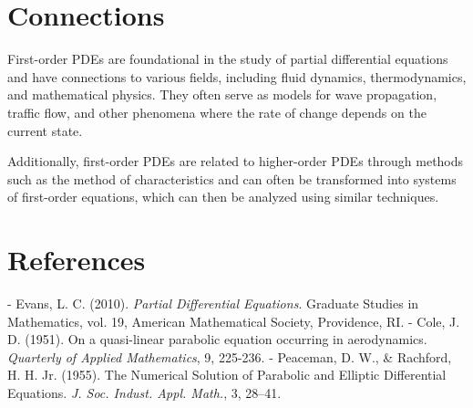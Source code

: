 \documentclass[11pt,a4paper]{article}
\begin{document}
\section{Connections}
First-order PDEs are foundational in the study of partial differential equations and have connections to various fields, including fluid dynamics, thermodynamics, and mathematical physics. They often serve as models for wave propagation, traffic flow, and other phenomena where the rate of change depends on the current state.

Additionally, first-order PDEs are related to higher-order PDEs through methods such as the method of characteristics and can often be transformed into systems of first-order equations, which can then be analyzed using similar techniques.

\section{References}
- Evans, L. C. (2010). \textit{Partial Differential Equations}. Graduate Studies in Mathematics, vol. 19, American Mathematical Society, Providence, RI.
- Cole, J. D. (1951). On a quasi-linear parabolic equation occurring in aerodynamics. \textit{Quarterly of Applied Mathematics}, 9, 225-236.
- Peaceman, D. W., & Rachford, H. H. Jr. (1955). The Numerical Solution of Parabolic and Elliptic Differential Equations. \textit{J. Soc. Indust. Appl. Math.}, 3, 28–41.
\end{document}
